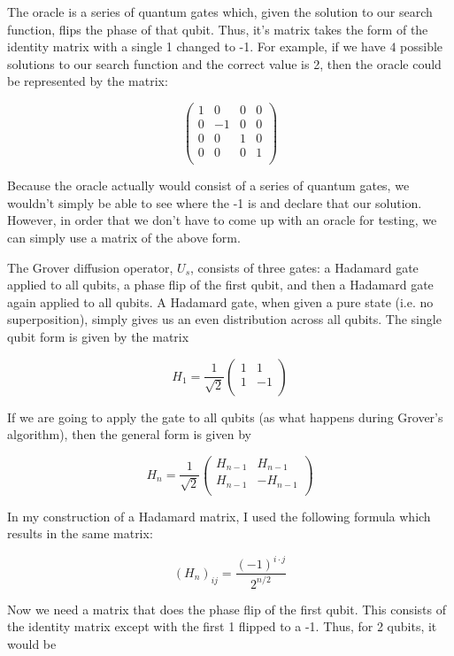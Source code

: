\documentclass[11pt]{article}
\begin{document}
The oracle is a series of quantum gates which, given the solution to our search function, flips the phase of that qubit. Thus, it's matrix takes the form of the identity matrix with a single 1 changed to -1. For example, if we have $4$ possible solutions to our search function and the correct value is 2, then the oracle could be represented by the matrix:

$$\begin{pmatrix}
1 & 0 & 0 & 0 \\
0 & -1 & 0 & 0 \\
0 & 0 & 1 & 0 \\
0 & 0 & 0 & 1 \\
\end{pmatrix}$$

Because the oracle actually would consist of a series of quantum gates, we wouldn't simply be able to see where the -1 is and declare that our solution. However, in order that we don't have to come up with an oracle for testing, we can simply use a matrix of the above form.

The Grover diffusion operator, $U_{s}$, consists of three gates: a Hadamard gate applied to all qubits, a phase flip of the first qubit, and then a Hadamard gate again applied to all qubits. A Hadamard gate, when given a pure state (i.e. no superposition), simply gives us an even distribution across all qubits. The single qubit form is given by the matrix

$$H_{1}=\frac{1}{\sqrt{2}} \begin{pmatrix}
1 & 1 \\
1 & -1 \\
\end{pmatrix}$$

If we are going to apply the gate to all qubits (as what happens during Grover's algorithm), then the general form is given by

$$H_{n}=\frac{1}{\sqrt{2}}\begin{pmatrix}
H_{n-1} & H_{n-1} \\
H_{n-1} & -H_{n-1} \\
\end{pmatrix}$$

In my construction of a Hadamard matrix, I used the following formula which results in the same matrix:

$$(H_{n})_{ij}= \frac{(-1)^{i\cdot j}}{2^{n/2}} $$

Now we need a matrix that does the phase flip of the first qubit. This consists of the identity matrix except with the first 1 flipped to a -1. Thus, for 2 qubits, it would be
\end{document}
